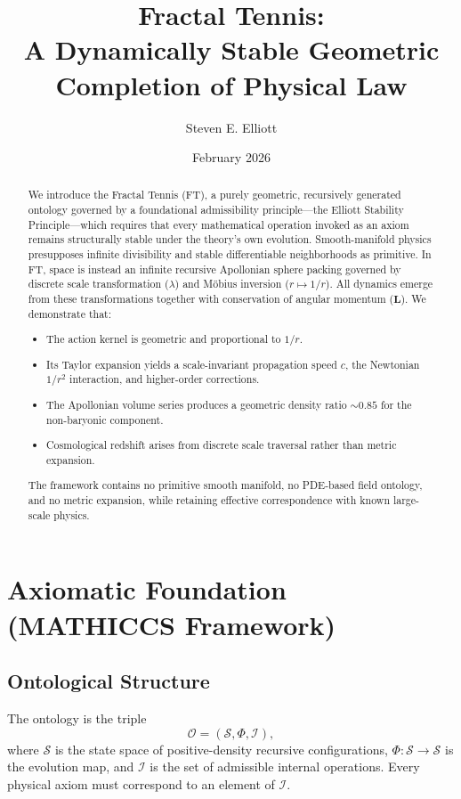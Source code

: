 \documentclass[11pt,a4paper]{article}
\title{Fractal Tennis: \\
A Dynamically Stable Geometric Completion of Physical Law}
\author{Steven E. Elliott}
\date{February 2026}
\begin{document}
\maketitle

\begin{abstract}
We introduce the Fractal Tennis (FT), a purely geometric, recursively generated ontology governed by a foundational admissibility principle---the Elliott Stability Principle---which requires that every mathematical operation invoked as an axiom remains structurally stable under the theory's own evolution.
Smooth-manifold physics presupposes infinite divisibility and stable differentiable neighborhoods as primitive. In FT, space is instead an infinite recursive Apollonian sphere packing governed by discrete scale transformation ($\lambda$) and M\"obius inversion ($r \mapsto 1/r$). All dynamics emerge from these transformations together with conservation of angular momentum ($\mathbf{L}$).
We demonstrate that:
\begin{itemize}
\item The action kernel is geometric and proportional to $1/r$.
\item Its Taylor expansion yields a scale-invariant propagation speed $c$, the Newtonian $1/r^2$ interaction, and higher-order corrections.
\item The Apollonian volume series produces a geometric density ratio $\sim 0.85$ for the non-baryonic component.
\item Cosmological redshift arises from discrete scale traversal rather than metric expansion.
\end{itemize}
The framework contains no primitive smooth manifold, no PDE-based field ontology, and no metric expansion, while retaining effective correspondence with known large-scale physics.
\end{abstract}

\section{Axiomatic Foundation (MATHICCS Framework)}
\subsection{Ontological Structure}
The ontology is the triple
\[
\mathcal{O} = (\mathcal{S}, \Phi, \mathcal{I}),
\]
where $\mathcal{S}$ is the state space of positive-density recursive configurations, $\Phi:\mathcal{S}\to\mathcal{S}$ is the evolution map, and $\mathcal{I}$ is the set of admissible internal operations. Every physical axiom must correspond to an element of $\mathcal{I}$.
\end{document}
